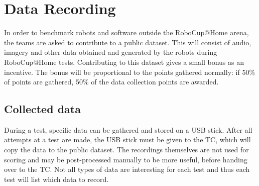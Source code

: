 \section{Data Recording}
  \label{rule:datarecording}
  In order to benchmark robots and software outside the RoboCup@Home arena, the teams are asked to contribute to a public dataset.
  This will consist of audio, imagery and other data obtained and generated by the robots during RoboCup@Home tests.
  Contributing to this dataset gives a small bonus as an incentive.
  The bonus will be proportional to the points gathered normally:
    if 50\% of points are gathered, 50\% of the data collection points are awarded.

  \subsection{Collected data}
    During a test, specific data can be gathered and stored on a USB stick.
    After all attempts at a test are made, the USB stick must be given to the TC, which will copy the data to the public dataset.
    The recordings themselves are not used for scoring and may be post-processed manually to be more useful, before handing over to the TC.
    Not all types of data are interesting for each test and thus each test will list which data to record.

